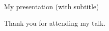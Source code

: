 
\let\header\big
\let\subheader\large

\newslide

{\center %
    \header My presentation
    \subheader (with subtitle)}

\newslide

{\center 
    Thank you for attending my talk.}

\bye
